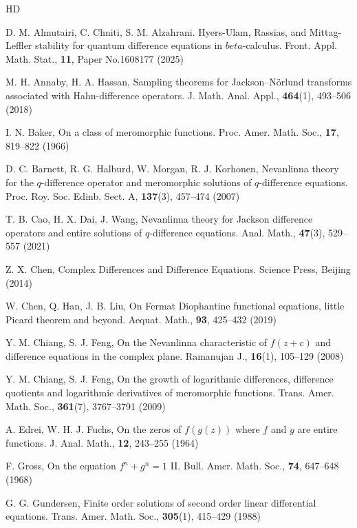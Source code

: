 \documentclass[sn-mathphys-num]{sn-jnl}%
\theoremstyle{thmstyleone}%
\theoremstyle{thmstyletwo}%
\theoremstyle{thmstylethree}%
\begin{document}
\begin{thebibliography}{HD}
	
 D. M. Almutairi, C. Chniti, S. M. Alzahrani. Hyers-Ulam, Rassias, and Mittag-Leffler stability for quantum difference equations in \(beta\)-calculus. Front. Appl. Math. Stat., \textbf{11}, Paper No.1608177 (2025)

 M. H. Annaby, H. A. Hassan, Sampling theorems for Jackson--N\"{o}rlund transforms associated with Hahn-difference operators. J. Math. Anal. Appl., \textbf{464}(1), 493--506 (2018)

 I. N. Baker, On a class of meromorphic functions. Proc. Amer. Math. Soc., \textbf{17}, 819--822 (1966)

 D. C. Barnett, R. G. Halburd, W. Morgan, R. J. Korhonen, Nevanlinna theory for the $q$-difference operator and meromorphic solutions of $q$-difference equations. Proc. Roy. Soc. Edinb. Sect. A, \textbf{137}(3), 457--474 (2007)

 T. B. Cao, H. X. Dai, J. Wang, Nevanlinna theory for Jackson difference operators and entire solutions of $q$-difference equations. Anal. Math., \textbf{47}(3), 529--557 (2021)

 Z. X. Chen, Complex Differences and Difference Equations. Science Press, Beijing (2014)

 W. Chen, Q. Han, J. B. Liu, On Fermat Diophantine functional equations, little Picard theorem and beyond. Aequat. Math., \textbf{93}, 425--432 (2019)

 Y. M. Chiang, S. J. Feng, On the Nevanlinna characteristic of $f(z + c)$ and difference equations in the complex plane. Ramanujan J., \textbf{16}(1), 105--129 (2008)

 Y. M. Chiang, S. J. Feng, On the growth of logarithmic differences, difference quotients and logarithmic derivatives of meromorphic functions. Trans. Amer. Math. Soc., \textbf{361}(7), 3767--3791 (2009)

 A. Edrei, W. H. J. Fuchs, On the zeros of \(f(g(z))\) where \(f\) and \(g\) are entire functions. J. Anal. Math., \textbf{12}, 243--255 (1964)

 F. Gross, On the equation \(f^{n}+g^{n}=1\) II. Bull. Amer. Math. Soc., \textbf{74}, 647--648 (1968)

 G. G. Gundersen, Finite order solutions of second order linear differential equations. Trans. Amer. Math. Soc., \textbf{305}(1), 415--429 (1988)


\end{thebibliography}
\end{document}
